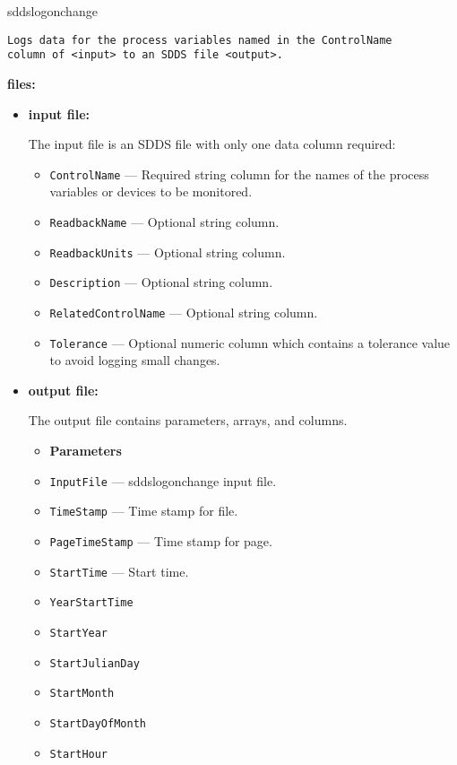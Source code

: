 \begin{sddsprog}{sddslogonchange}
\begin{verbatim}
Logs data for the process variables named in the ControlName
column of <input> to an SDDS file <output>.
\end{verbatim}
\item {\bf files:}
\begin{itemize}
\item {\bf input file:}\par
The input file is an SDDS file with only one data column required:
\begin{itemize}
        \item {\tt ControlName} --- Required string column for the names of the process variables or devices to be monitored.
        \item {\tt ReadbackName} --- Optional string column.
        \item {\tt ReadbackUnits} --- Optional string column.
        \item {\tt Description} --- Optional string column.
        \item {\tt RelatedControlName} --- Optional string column.
        \item {\tt Tolerance} --- Optional numeric column which contains a tolerance value to avoid logging small changes.
\end{itemize}

\item {\bf output file:}\par
The output file contains parameters, arrays, and columns.
\begin{itemize}
        \item {\bf Parameters}
        \item {\tt InputFile} --- sddslogonchange input file.
        \item {\tt TimeStamp} --- Time stamp for file.
        \item {\tt PageTimeStamp} --- Time stamp for page.
        \item {\tt StartTime} --- Start time.
        \item {\tt YearStartTime}
        \item {\tt StartYear}
        \item {\tt StartJulianDay}
        \item {\tt StartMonth}
        \item {\tt StartDayOfMonth}
        \item {\tt StartHour}
\end{itemize}
\begin{verbatim}


\end{verbatim}
\end{itemize}
\end{sddsprog}
